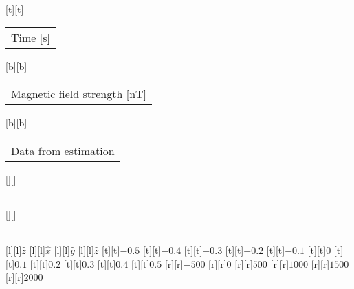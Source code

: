 [t][t]{\fontsize{8}{12}\selectfont \setlength{\tabcolsep}{0pt}\begin{tabular}{c}Time [s]\end{tabular}}%
[b][b]{\fontsize{8}{12}\selectfont \setlength{\tabcolsep}{0pt}\begin{tabular}{c}Magnetic field strength [nT]\end{tabular}}%
[b][b]{\fontsize{8}{12}\selectfont \setlength{\tabcolsep}{0pt}\begin{tabular}{c}Data from estimation\end{tabular}}%
[][]{\fontsize{8}{12}\selectfont \setlength{\tabcolsep}{0pt}\begin{tabular}{c} \end{tabular}}%
[][]{\fontsize{8}{12}\selectfont \setlength{\tabcolsep}{0pt}\begin{tabular}{c} \end{tabular}}%
[l][l]{\fontsize{6}{8}\selectfont $\hat{z}$}%
[l][l]{\fontsize{6}{8}\selectfont $\hat{x}$}%
[l][l]{\fontsize{6}{8}\selectfont $\hat{y}$}%
[l][l]{\fontsize{6}{8}\selectfont $\hat{z}$}%
%
\fontsize{6}{8}%
\selectfont%
%
[t][t]{$-0.5$}%
[t][t]{$-0.4$}%
[t][t]{$-0.3$}%
[t][t]{$-0.2$}%
[t][t]{$-0.1$}%
[t][t]{$0$}%
[t][t]{$0.1$}%
[t][t]{$0.2$}%
[t][t]{$0.3$}%
[t][t]{$0.4$}%
[t][t]{$0.5$}%
%
[r][r]{$-500$}%
[r][r]{$0$}%
[r][r]{$500$}%
[r][r]{$1000$}%
[r][r]{$1500$}%
[r][r]{$2000$}%
%

